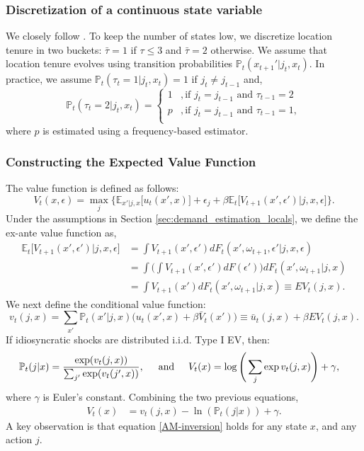 \documentclass[11pt]{article}
\newcommand{\E}{\mathbb{E}}
\newcommand{\Prob}{\mathbb{P}}
\newcommand{\spaceand}{\hspace{5mm}\text{and}\hspace{5mm}}
\begin{document}
\vspace{-0.45cm}
\subsubsection{Discretization of a continuous state variable}\label{sec: appendix discretization of loc capital}

We closely follow \cite{rust1987optimal}. To keep the number of states low, we discretize location tenure in two buckets: $\bar{\tau}=1$ if  $\tau \le 3$ and $\bar{\tau} =2$ otherwise. We assume that location tenure evolves using transition probabilities $\Prob_t(x_{t+1}'|j_t,x_t)$. In practice, we assume $\Prob_t(\tau_t = 1|j_t,x_t) = 1$ if $j_t \neq j_{t-1}$ and,
\begin{equation*}
    \Prob_t(\tau_t = 2|j_t, x_t) = \begin{cases}
    1 & , \text{if } j_t = j_{t-1} \text{ and } \tau_{t-1} = 2 \\
    p & , \text{if } j_t = j_{t-1} \text{ and } \tau_{t-1} = 1, \\
    \end{cases}
\end{equation*}
where $p$ is estimated using a frequency-based estimator.

\subsubsection{Constructing the Expected Value Function}\label{sec: appendix ECCP methodology}
The value function is defined as follows:
\begin{equation*}
    V_t(x,\epsilon) = \max_{j} \Bigg \{ \E_{x'|j,x} \Big[ u_t(x',x) \Big] + \epsilon_{j} + \beta \E_t \Big[ V_{t+1}(x',\epsilon') | j,x, \epsilon \Big] \Bigg\}. 
\end{equation*}
Under the assumptions in Section \ref{sec:demand_estimation_locals}, we define the ex-ante value function as,
 \begin{align}\label{eq: define EV function}
\E_t\big[V_{t+1}(x',\epsilon')|j,x,\epsilon\big] &= \int V_{t+1}(x',\epsilon') dF_t(x',\omega_{t+1},\epsilon'|j,x,\epsilon) \\
    &=\int \Big(\int V_{t+1}(x',\epsilon')dF(\epsilon')\Big)dF_t(x',\omega_{t+1}|j,x)\\
     &=\int {V}_{t+1}(x')dF_t(x',\omega_{t+1}|j,x) \equiv EV_t(j,x).
     \end{align}
We next define the conditional value function:
\[ v_t(j,x) = \sum_{x'} \Prob_t(x'|j,x)\big(u_t(x',x)+\beta\bar{V}_{t}(x')\big) \equiv \bar{u}_t(j,x) +\beta EV_t(j,x).\]
If idiosyncratic shocks are distributed i.i.d. Type I EV, then:
\begin{align}
   \Prob_t(j|x)=\frac{\exp(v_t(j,x))}{\sum_{j'}\exp(v_t(j',x))}, \spaceand   {V}_t(x)&=\log\Bigg(\sum_j\exp v_t(j,x)\Bigg) + \gamma,\label{CCP}
\end{align} 
where $\gamma$ is Euler's constant. Combining the two previous equations,
\begin{align}
    {V}_t(x)&=v_t(j,x)-\ln(\Prob_t(j|x))+\gamma.\label{AM-inversion}
\end{align}
A key observation is that equation \eqref{AM-inversion} holds for any state $x$, and any action $j$.
\end{document}
